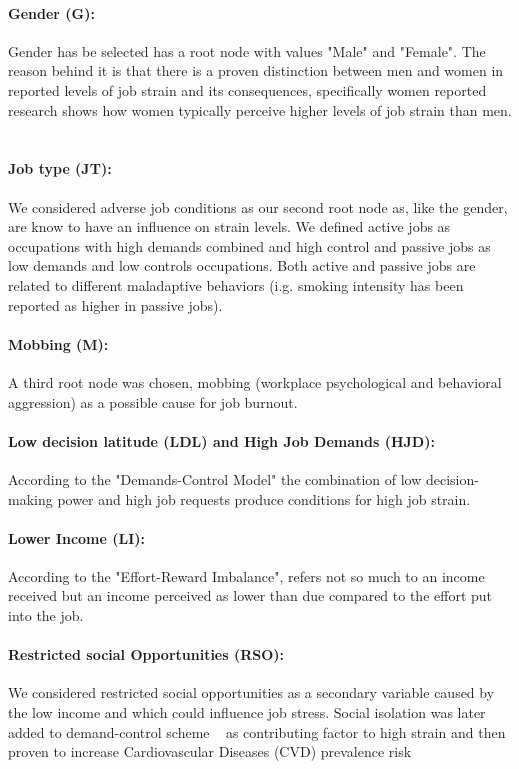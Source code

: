 \paragraph{Gender (G):} Gender has be selected has a root node with values "Male" and "Female". The reason behind it is that there is a proven distinction between men and women in reported levels of job strain and its consequences, specifically women reported research shows how women typically perceive higher levels of job strain than men. ~\cite{ref_article7}
\paragraph{Job type (JT):} We considered adverse job conditions as our second root node as, like the gender, are know to have an influence on strain levels. We defined active jobs as occupations with high demands combined and high control and passive jobs as low demands and low controls occupations. Both active and passive jobs are related to different maladaptive behaviors (i.g. smoking intensity has been reported as higher in passive jobs). ~\cite{ref_article3}
\paragraph{Mobbing (M):} A third root node was chosen, mobbing (workplace psychological and behavioral aggression) as a possible cause for job burnout.  
\paragraph{Low decision latitude (LDL) and High Job Demands (HJD):} According to the "Demands-Control Model" the combination of low decision-making power and high job requests produce conditions for high job strain. ~\cite{ref_article6}
\paragraph{Lower Income (LI):} According to the "Effort-Reward Imbalance", refers not so much to an income received but an income perceived as lower than due compared to the effort put into the job. ~\cite{ref_article6}
\paragraph{Restricted social Opportunities (RSO):} We considered restricted social opportunities as a secondary variable caused by the low income and which could influence job stress. Social isolation was later added to demand-control scheme ~\cite{ref_article5} as contributing factor to high strain and then proven to increase Cardiovascular Diseases (CVD) prevalence risk ~\cite{ref_article2} 

